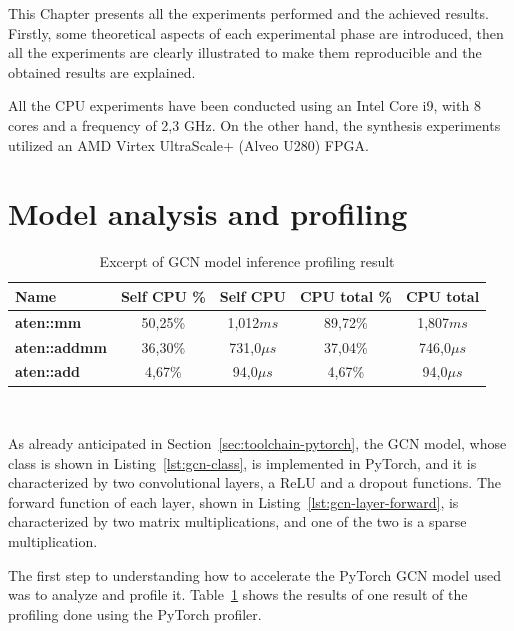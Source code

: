 This Chapter presents all the experiments performed and the achieved results.
Firstly, some theoretical aspects of each experimental phase are introduced, then all the experiments are clearly illustrated to make them reproducible and the obtained results are explained.

All the CPU experiments have been conducted using an Intel Core i9, with 8 cores and a frequency of 2,3 GHz.
On the other hand, the synthesis experiments utilized an AMD Virtex UltraScale+ (Alveo U280) FPGA\@.

\section{Model analysis and profiling}
\label{sec:model-analysis}%

\begin{table}[b]
\centering
    \begin{tabular}{|p{6em} c c c c|}
    \hline
    \textbf{Name} & \textbf{Self CPU \%} & \textbf{Self CPU} & \textbf{CPU total \%} & \textbf{CPU total} \T\B \\
    \hline \hline
    \textbf{aten::mm} & 50,25\% & 1,012$ms$ & 89,72\% & 1,807$ms$ \T\B\\
    \hline
    \textbf{aten::addmm} & 36,30\% & 731,0$\mu s$ & 37,04\% & 746,0$\mu s$ \T\B\\
    \hline
    \textbf{aten::add} & 4,67\% & 94,0$\mu s$ & 4,67\% & 94,0$\mu s$ \T\B\\
    \hline
    \end{tabular}
    \\[10pt]
    \caption{Excerpt of GCN model inference profiling result}
    \label{tab:gcn_profiling}
\end{table}

As already anticipated in Section~\ref{sec:toolchain-pytorch}, the GCN model, whose class is shown in Listing~\ref{lst:gcn-class}, is implemented in PyTorch, and it is characterized by two convolutional layers, a ReLU and a dropout functions.
The forward function of each layer, shown in Listing~\ref{lst:gcn-layer-forward}, is characterized by two matrix multiplications, and one of the two is a sparse multiplication.

The first step to understanding how to accelerate the PyTorch GCN model used was to analyze and profile it.
Table~\ref{tab:gcn_profiling} shows the results of one result of the profiling done using the PyTorch profiler.

